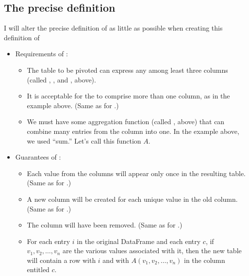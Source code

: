 \documentclass[letterpaper,10pt,english]{sphinxmanual}
\begin{document}
\subsection{The precise definition}
\label{\detokenize{chapter-6-single-table-verbs:id3}}
I will alter the precise definition of  as little as possible when creating this definition of 
\begin{itemize}
\item {} 
Requirements of :
\begin{itemize}
\item {} 
The table to be pivoted can express any  among least three columns (called , , and , above).

\item {} 
It is acceptable for the  to comprise more than one column, as in the example above.  (Same as for .)

\item {} 
We must have some aggregation function (called , above) that can combine many entries from the  column into one.  In the example above, we used “sum.”  Let’s call this function \(A\).

\end{itemize}

\item {} 
Guarantees of :
\begin{itemize}
\item {} 
Each value from the  columns will appear only once in the resulting table.  (Same as for .)

\item {} 
A new column will be created for each unique value in the old  column.  (Same as for .)

\item {} 
The  column will have been removed.  (Same as for .)

\item {} 
For each  entry \(i\) in the original DataFrame and each  entry \(c\), if \(v_1,v_2,\ldots,v_n\) are the various values associated with it, then the new table will contain a row with  \(i\) and with \(A(v_1,v_2,\ldots,v_n)\) in the column entitled \(c\).

\end{itemize}

\end{itemize}
\end{document}
